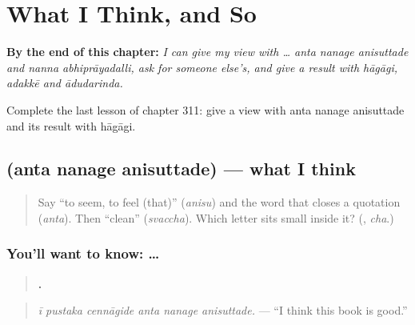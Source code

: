 
\chapter{What I Think, and So}
\label{ch:ka-what-i-think-and-so}

\begin{chapteropening}
\textbf{By the end of this chapter:} \emph{I can give my view with … anta nanage anisuttade and nanna abhiprāyadalli, ask for someone else's, and give a result with hāgāgi, adakkē and ādudarinda.}

Complete the last lesson of chapter 311: give a view with anta nanage anisuttade and its result with hāgāgi.
\end{chapteropening}

\section[\texorpdfstring{\kn{ಅಂತ} \kn{ನನಗೆ} \kn{ಅನಿಸುತ್ತದೆ} (anta nanage anisuttade)}{ಅಂತ ನನಗೆ ಅನಿಸುತ್ತದೆ (anta nanage anisuttade)}]{   (anta nanage anisuttade) — what I think}

\label{lesson:KA-C311-anta-anisuttade}



\begin{quote}
Say \textquotedblleft{}to seem, to feel (that)\textquotedblright{} (\emph{anisu}) and the word that closes a quotation (\emph{anta}). Then \textquotedblleft{}clean\textquotedblright{} (\emph{svaccha}). Which letter sits small inside it? (\textbf{}, \emph{cha}.)
\end{quote}

\subsection*{You'll want to know: …   }
\begin{quote}
\textbf{     .}
\end{quote}

\begin{quote}
\emph{ī pustaka cennāgide anta nanage anisuttade.} — \textquotedblleft{}I think this book is good.\textquotedblright{}
\end{quote}

